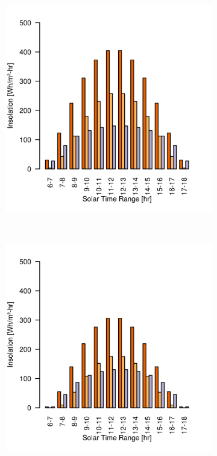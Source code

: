 \begin{figure}[h]
\begin{subfigure}[t]{\subfigureWidth}
  		\includegraphics[height=\graphicsHeight]{sections/mars-solar-energy/solar-radiation/plots/ih-ibh-and-idh-variation-2-for-ls-71-phi-0-tau-05-and-albedo-027}
  		\label{fig:sub:insolation-phi-m20}
  	\end{subfigure}\\[0.8ex]
    \begin{subfigure}[t]{\subfigureWidth}
      \centering
  		\includegraphics[height=\graphicsHeight]{sections/mars-solar-energy/solar-radiation/plots/ih-ibh-and-idh-variation-3-for-ls-71-phi-20-tau-05-and-albedo-027}

\end{subfigure}
\end{figure}
